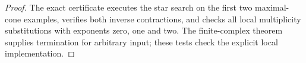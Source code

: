 \begin{proof}
The exact certificate
executes the star search on the first two
maximal-cone examples, verifies both inverse
contractions, and checks all local multiplicity
substitutions with exponents zero, one and two.
The finite-complex theorem supplies termination for
arbitrary input; these tests check the explicit
local implementation.
\end{proof}
